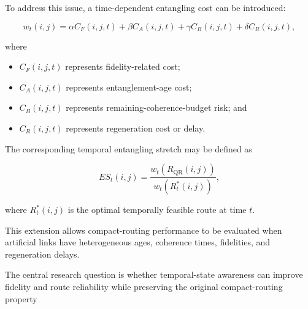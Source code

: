 To address this issue, a time-dependent entangling cost can be introduced:

\begin{equation}
    w_t(i,j)
    =
    \alpha C_F(i,j,t)
    +
    \beta C_A(i,j,t)
    +
    \gamma C_B(i,j,t)
    +
    \delta C_R(i,j,t),
\end{equation}

where

\begin{itemize}
    \item $C_F(i,j,t)$ represents fidelity-related cost;
    \item $C_A(i,j,t)$ represents entanglement-age cost;
    \item $C_B(i,j,t)$ represents remaining-coherence-budget risk; and
    \item $C_R(i,j,t)$ represents regeneration cost or delay.
\end{itemize}

The corresponding temporal entangling stretch may be defined as

\begin{equation}
    ES_t(i,j)
    =
    \frac
    {
    w_t
    \left(
    R_{\mathrm{QR}}(i,j)
    \right)
    }
    {
    w_t
    \left(
    R_t^{*}(i,j)
    \right)
    },
\end{equation}

where $R_t^{*}(i,j)$ is the optimal temporally feasible route at time $t$.

This extension allows compact-routing performance to be evaluated when artificial links have heterogeneous ages, coherence times, fidelities, and regeneration delays.

The central research question is whether temporal-state awareness can improve fidelity and route reliability while preserving the original compact-routing property

